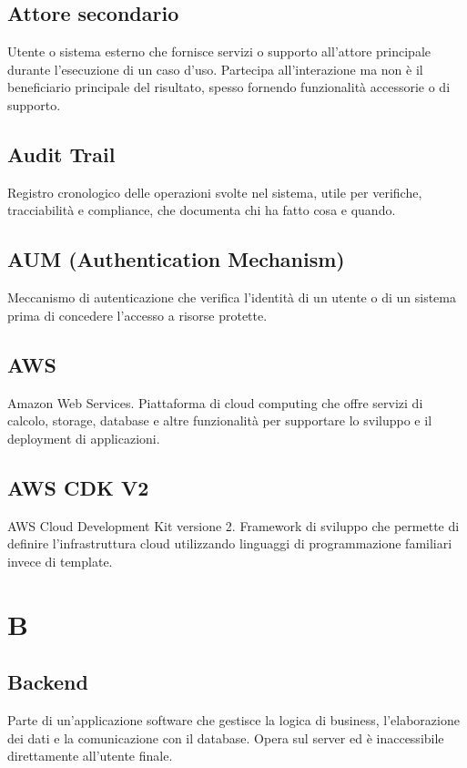 \documentclass[a4paper,11pt]{article}
\begin{document}
\subsection{Attore secondario}
Utente o sistema esterno che fornisce servizi o supporto all'attore principale durante l'esecuzione di un caso d'uso. Partecipa all'interazione ma non è il beneficiario principale del risultato, spesso fornendo funzionalità accessorie o di supporto.

\subsection{Audit Trail}
Registro cronologico delle operazioni svolte nel sistema, utile per verifiche, tracciabilità e compliance, che documenta chi ha fatto cosa e quando.

\subsection{AUM (Authentication Mechanism)}
Meccanismo di autenticazione che verifica l'identità di un utente o di un sistema prima di concedere l'accesso a risorse protette.

\subsection{AWS}
Amazon Web Services. Piattaforma di cloud computing che offre servizi di calcolo, storage, database e altre funzionalità per supportare lo sviluppo e il deployment di applicazioni.

\subsection{AWS CDK V2}
AWS Cloud Development Kit versione 2. Framework di sviluppo che permette di definire l'infrastruttura cloud utilizzando linguaggi di programmazione familiari invece di template.

\newpage
\section{B}

\subsection{Backend}
Parte di un'applicazione software che gestisce la logica di business, l'elaborazione dei dati e la comunicazione con il database. Opera sul server ed è inaccessibile direttamente all'utente finale.
\end{document}
